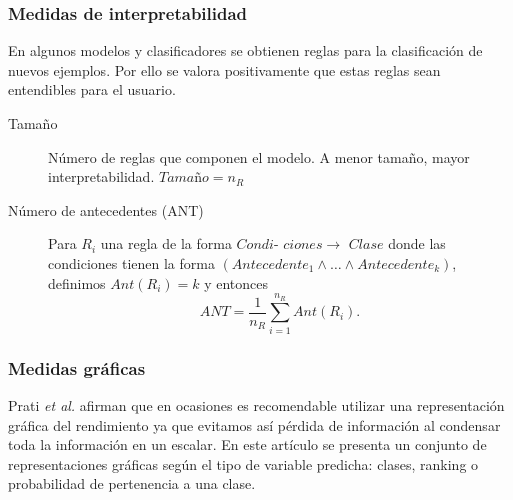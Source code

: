 \subsubsection*{Medidas de interpretabilidad} 
	En algunos modelos y clasificadores se obtienen reglas 
para la clasificación de nuevos ejemplos. Por ello se valora 
positivamente que estas reglas sean entendibles para el 
usuario. 
	\begin{description}
	\item[Tamaño] Número de reglas que componen el modelo. 
		A menor tamaño, mayor interpretabilidad. 
		$\textit{Tamaño} = n_R$
	\item[Número de antecedentes (ANT)] Para $R_i$ una regla 
		de la forma $\textit{Condi-}$ ${ciones } \rightarrow 
		\textit{ Clase}$ donde las condiciones tienen la 
		forma $(Antecedente_1 \wedge \dots \wedge 
		Antecedente_k)$, definimos $Ant(R_i) = k$ y entonces 
		\[ANT = \frac{1}{n_R} 
				\sum\limits_{i=1}^{n_R} Ant(R_i).\]
	\end{description}


\subsubsection*{Medidas gráficas}

	Prati \textit{et al.} \cite{DBLP:journals/tkde/PratiBM11} afirman que en ocasiones es 
recomendable utilizar una representación gráfica del 
rendimiento ya que evitamos así pérdida de información al 
condensar toda la información en un escalar. En este artículo 
se presenta un conjunto de representaciones gráficas según el 
tipo de variable predicha: clases, ranking o probabilidad de 
pertenencia a una clase.
	
